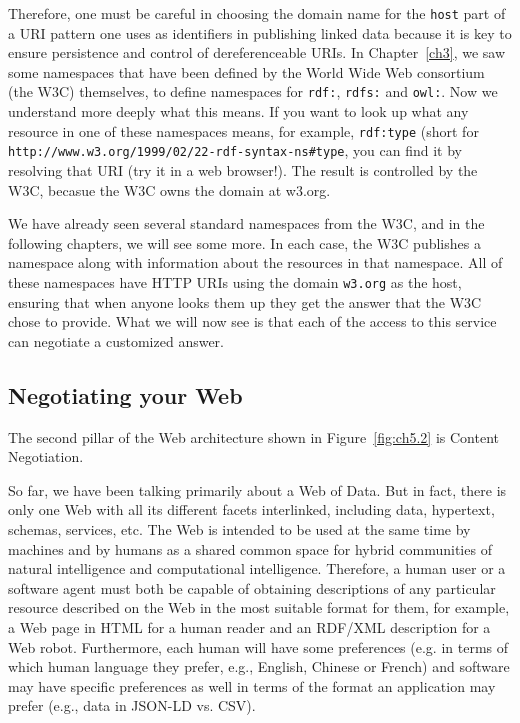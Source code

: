 Therefore, one must be careful in choosing the domain name for the \texttt{host}
part of a URI pattern one uses as identifiers in publishing linked data
because it is key to ensure persistence and control of dereferenceable
URIs.  In Chapter~\ref{ch3}, we saw some namespaces that have been defined 
by the World Wide Web consortium (the W3C) themselves, to define namespaces for 
\texttt{rdf:}, \texttt{rdfs:} and \texttt{owl:}. Now we understand more deeply what this
means. If you want to look up what any resource in one of these namespaces means, 
for example, \texttt{rdf:type} 
(short for \texttt{http://www.w3.org/1999/02/22-rdf-syntax-ns\#type}, you can 
find it by resolving that URI (try it in a web browser!).  The result is controlled by the 
W3C, becasue the W3C owns the domain at w3.org. 


We have already seen several standard namespaces from the W3C, and in the following 
chapters, we will see some more.  In each case, the W3C publishes a namespace along 
with information about the resources in that namespace.  All of these namespaces have HTTP 
URIs using the domain  \texttt{w3.org} as the host, ensuring that when anyone looks 
them up they get the answer that the W3C chose to provide.  What we will now see is
that each of the access to this service can negotiate a customized
answer.

\hypertarget{negotiating-your-web}{%
\subsection{Negotiating your Web}\label{negotiating-your-web}}

The second pillar of the Web architecture shown in Figure~\ref{fig:ch5.2} is  Content Negotiation.

So far, we have been talking primarily about a Web of Data.  But in fact, there  is only one
Web with all its different facets interlinked, including data, hypertext, schemas,
services, etc.  The Web is intended to be used at the same time by
machines and by humans as a shared common space for hybrid communities
of natural intelligence and computational intelligence. Therefore, a
human user or a software agent must both be capable of obtaining
descriptions of any particular resource described on the Web  in the most suitable
format for them, for example,  a Web page in HTML for a human reader  and an RDF/XML
description for a Web robot.   Furthermore, each human will have some preferences (e.g.
in terms of which human language they prefer, e.g.,  English, Chinese or French) and
software may have specific preferences as well  in terms of the format an application may prefer (e.g., 
data in JSON-LD vs. CSV).

